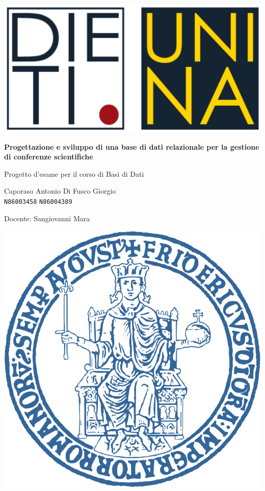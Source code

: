 \documentclass[a4paper, oneside, 10pt]{book}
\begin{document}
\begin{titlepage}
\begin{center}

\includegraphics[scale=0.6]{Immagini/logo_dieti.png}
\vspace*{1cm}

{\Huge{\textbf{Progettazione e sviluppo di una base di dati relazionale per la gestione di conferenze scientifiche}}}

\vspace{1cm}

{\Large Progetto d'esame per il corso di Basi di Dati}


\vfill

{\Large Caporaso Antonio} \qquad \Large{Di Fusco Giorgio}\\
\texttt{N86003458} \qquad \texttt{N86004389}\\

\vspace{1cm}

Docente: Sangiovanni Mara\\

\vspace{1cm}

\includegraphics[scale=0.6]{Immagini/LogoUnina.png}



\end{center}
\end{titlepage}
\end{document}

